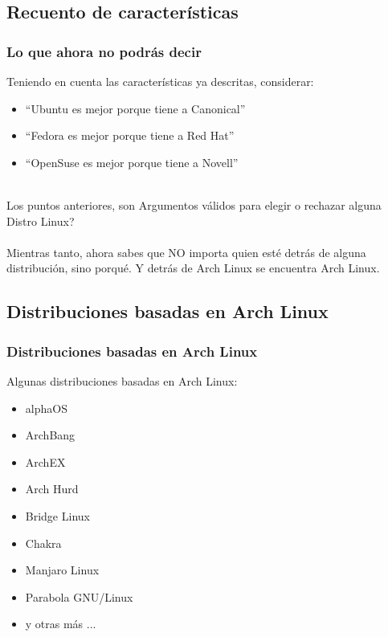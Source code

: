 \documentclass[9pt,t]{beamer}
\begin{document}
\subsection{Recuento de características}

\begin{frame}\justifying
  \frametitle{Lo que ahora no podrás decir}
  Teniendo en cuenta las características ya descritas, considerar:
  \begin{block}{}
   \begin{itemize}\justifying
      \item ``Ubuntu es mejor porque tiene a Canonical''
      \item ``Fedora es mejor porque tiene a Red Hat''
      \item ``OpenSuse es mejor porque tiene a Novell''
   \end{itemize}
  \end{block}
  \ \\
  Los puntos anteriores, son Argumentos válidos para elegir o rechazar alguna Distro Linux?
  \ \\ \ \\
  Mientras tanto, ahora sabes que NO importa quien esté detrás de alguna distribución, sino porqué. 
  Y detrás de Arch Linux se encuentra Arch Linux.
\end{frame}

\subsection{Distribuciones basadas en Arch Linux}
\begin{frame}\justifying
  \frametitle{Distribuciones basadas en Arch Linux}
    Algunas distribuciones basadas en Arch Linux:
    \ \\
    \begin{itemize}\justifying
      \item alphaOS
      \item ArchBang
      \item ArchEX
      \item Arch Hurd
      \item Bridge Linux
      \item Chakra
      \item Manjaro Linux
      \item Parabola GNU/Linux
      \item y otras más ...
   \end{itemize}
\end{frame}
\end{document}
